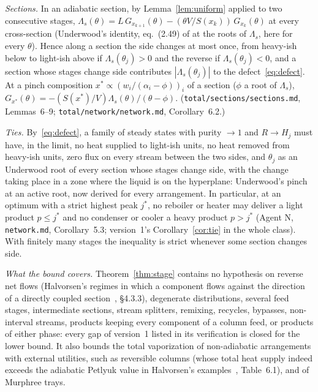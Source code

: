 \emph{Sections.} In an adiabatic section, by Lemma~\ref{lem:uniform} applied to two consecutive stages,
$\Lambda_s(\theta)=L\,G_{x_{k+1}}(\theta)-(\theta V/S(x_k))\,G_{x_k}(\theta)$ at every cross-section (Underwood's identity, eq.~(2.49) of
\autocite{HalvorsenThesis} at the roots of $\Lambda_s$, here for every $\theta$). Hence along a section the side changes at
most once, from heavy-ish below to light-ish above if $\Lambda_s(\theta_j)>0$ and the reverse if $\Lambda_s(\theta_j)<0$, and a
section whose stages change side contributes $|\Lambda_s(\theta_j)|$ to the defect~\eqref{eq:defect}. At a pinch composition
$x^*\propto(w_i/(\alpha_i-\phi))_i$ of a section ($\phi$ a root of $\Lambda_s$), $G_{x^*}(\theta)=-(S(x^*)/V)\Lambda_s(\theta)/(\theta-\phi)$.
(\texttt{total/sections/sections.md}, Lemmas~6--9; \texttt{total/network/network.md}, Corollary~6.2.)

\emph{Ties.} By~\eqref{eq:defect}, a family of steady states with purity $\to1$ and $R\to H_j$ must have, in the limit, no heat
supplied to light-ish units, no heat removed from heavy-ish units, zero flux on every stream between the two sides, and
$\theta_j$ as an Underwood root of every section whose stages change side, with the change taking place in a zone where the
liquid is on the hyperplane: Underwood's pinch at an active root, now derived for every arrangement. In particular, at
an optimum with a strict highest peak $j^*$, no reboiler or heater may deliver a light product $p\le j^*$ and no condenser
or cooler a heavy product $p>j^*$ (Agent N, \texttt{network.md}, Corollary~5.3; version~1's Corollary~\ref{cor:tie} in
the whole class). With finitely many stages the inequality is strict whenever some section changes side.

\emph{What the bound covers.} Theorem~\ref{thm:stage} contains no hypothesis on reverse net flows (Halvorsen's regimes
in which a component flows against the direction of a directly coupled section~\autocite{HalvorsenThesis}, \S4.3.3),
degenerate distributions, several feed stages, intermediate sections, stream splitters, remixing, recycles, bypasses,
non-interval streams, products keeping every component of a column feed, or products of either phase: every gap of
version~1 listed in its verification is closed for the lower bound. It also bounds the total vaporization of
non-adiabatic arrangements with external utilities, such as reversible columns (whose total heat supply indeed exceeds
the adiabatic Petlyuk value in Halvorsen's examples~\autocite{HalvorsenThesis}, Table~6.1), and of Murphree trays.

